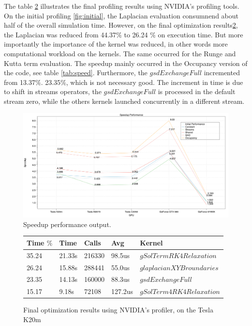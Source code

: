 The table \ref{fig:final} illustrates the final profiling results using NVIDIA's profiling tools. On the initial profiling \ref{fig:initial}, the Laplacian evaluation consumnend about half of the overall simulation time. However, on the final optimization results\ref{fig:final}, the Laplacian was reduced from 44.37$\%$ to 26.24 $\%$ on execution time. But more importantly the importance of the kernel was reduced, in other words more computational workload on the kernels. The same occurred for the Runge and Kutta term evaluation. The speedup mainly occurred in the Occupancy version of the code, see table \ref{tab:speed}. Furthermore, the $gsdExchangeFull$ incremented from 13.37$\%$. 23.35$\%$, which is not necessary good. The increment in time is due to shift in streams operators, the $gsdExchangeFull$ is processed in the default stream zero, while the others kernels launched concurrently in a different stream.
\begin{figure}[htbp]
	\centering
		\includegraphics[width=1.0 \textwidth]{Figures/speedup.png}
		\smallskip
	\caption[Speedup performance output]{Speedup performance output.}
	\label{fig:speedup}
\end{figure}

\begin{figure}[htbp]
	\centering
	  \begin{tabular} { |  l  |  l | l  | l | l |}
	      \hline
	    Time $\%$& Time & Calls & Avg & Kernel \\
    \hline
   35.24 & 21.33s & 216330 & 98.5us & $gSolTermRK4Relaxation$ \\
   \hline
   26.24 & 15.88s & 288441 & 55.0us & $glaplacianXYBroundaries$\\
   \hline
   23.35 & 14.13s & 160000 & 88.3us & $gsdExchangeFull$ \\
   \hline
   15.17 & 9.18s & 72108 & 127.2us & $gSolTerm4RK4Relaxation$\\ 
   \hline
    \end{tabular}
	\caption[Optimization results with the Profiler]{Final optimization results using NVIDIA's profiler, on the Tesla K20m}
	\label{fig:final}
\end{figure}
    
